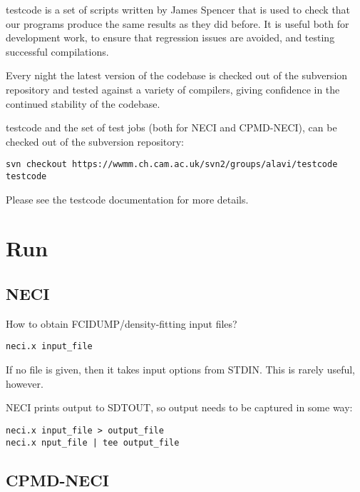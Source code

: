 \documentclass[openany,a4paper,10pt]{manual}
\begin{document}
testcode is a set of scripts written by James Spencer that is used to
check that our programs produce the same results as they did before.
It is useful both for development work, to ensure that regression issues
are avoided, and testing successful compilations.

Every night the latest version of the codebase is checked out of the
subversion repository and tested against a variety of compilers, giving
confidence in the continued stability of the codebase.

testcode and the set of test jobs (both for NECI and CPMD-NECI), can be
checked out of the subversion repository:

\begin{Verbatim}[commandchars=@\[\]]
svn checkout https://wwmm.ch.cam.ac.uk/svn2/groups/alavi/testcode testcode
\end{Verbatim}

Please see the testcode documentation for more details.

\resetcurrentobjects


\hypertarget{run}{}\chapter{Run}


\section{NECI}

\begin{notice}[note]
How to obtain FCIDUMP/density-fitting input files?
\end{notice}

\begin{Verbatim}[commandchars=@\[\]]
neci.x input_file
\end{Verbatim}

If no file is given, then it takes input options from STDIN.  This is rarely useful, however.

NECI prints output to SDTOUT, so output needs to be captured in some way:

\begin{Verbatim}[commandchars=@\[\]]
neci.x input_file > output_file
neci.x nput_file | tee output_file
\end{Verbatim}


\section{CPMD-NECI}
\end{document}
